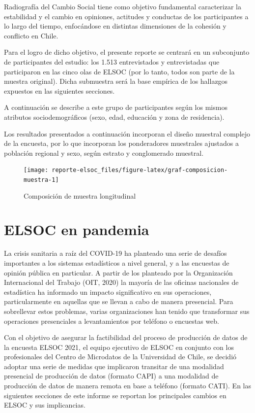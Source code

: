 \documentclass[
  12pt,
]{book}
\begin{document}
Radiografía del Cambio Social tiene como objetivo fundamental caracterizar la estabilidad y el cambio en opiniones, actitudes y conductas de los participantes a lo largo del tiempo, enfocándose en distintas dimensiones de la cohesión y conflicto en Chile.

Para el logro de dicho objetivo, el presente reporte se centrará en un subconjunto de participantes del estudio: los 1.513 entrevistados y entrevistadas que participaron en las cinco olas de ELSOC (por lo tanto, todos son parte de la muestra original). Dicha submuestra será la base empírica de los hallazgos expuestos en las siguientes secciones.

A continuación se describe a este grupo de participantes según los mismos atributos sociodemográficos (sexo, edad, educación y zona de residencia).

Los resultados presentados a continuación incorporan el diseño muestral complejo de la encuesta, por lo que incorporan los ponderadores muestrales ajustados a población regional y sexo, según estrato y conglomerado muestral.

\begin{figure}

{\centering \texttt{[image: reporte-elsoc\_files/figure-latex/graf-composicion-muestra-1]} 

}

\caption{Composición de muestra longitudinal}\label{fig:graf-composicion-muestra}
\end{figure}

\hypertarget{elsoc-en-pandemia}{%
\section*{ELSOC en pandemia}\label{elsoc-en-pandemia}}

La crisis sanitaria a raíz del COVID-19 ha planteado una serie de desafíos importantes a los sistemas estadísticos a nivel general, y a las encuestas de opinión pública en particular. A partir de los planteado por la Organización Internacional del Trabajo (OIT, 2020) la mayoría de las oficinas nacionales de estadística ha informado un impacto significativo en sus operaciones, particularmente en aquellas que se llevan a cabo de manera presencial. Para sobrellevar estos problemas, varias organizaciones han tenido que transformar sus operaciones presenciales a levantamientos por teléfono o encuestas web.

Con el objetivo de asegurar la factibilidad del proceso de producción de datos de la encuesta ELSOC 2021, el equipo ejecutivo de ELSOC en conjunto con los profesionales del Centro de Microdatos de la Universidad de Chile, se decidió adoptar una serie de medidas que implicaron transitar de una modalidad presencial de producción de datos (formato CAPI) a una modalidad de producción de datos de manera remota en base a teléfono (formato CATI). En las siguientes secciones de este informe se reportan los principales cambios en ELSOC y sus implicancias.
\end{document}
